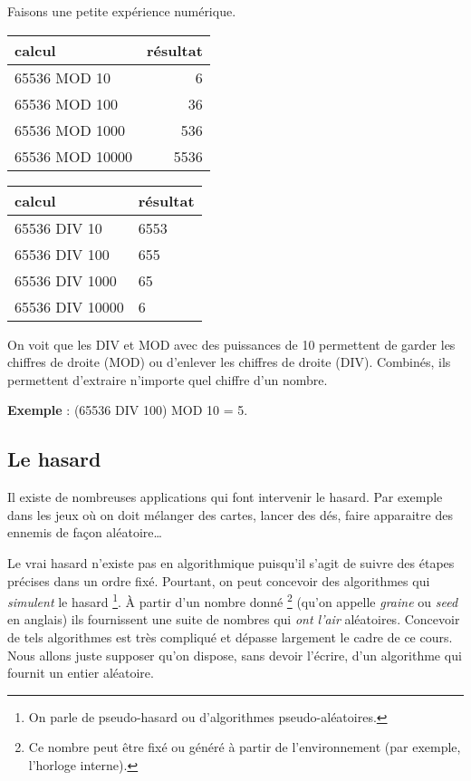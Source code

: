 				Faisons une petite expérience numérique.
				\begin{center}
				\begin{tabular}{|l|r|}\hline
					calcul & résultat \\\hline
					\hline
					65536 MOD 10 & 6 \\  
					65536 MOD 100 & 36 \\  
					65536 MOD 1000 & 536 \\  
					65536 MOD 10000 & 5536 \\ 
					\hline 
				\end{tabular}
				\qquad
				\begin{tabular}{|l|l|}\hline
					calcul & résultat \\\hline
					\hline
					65536 DIV 10 & 6553 \\  
					65536 DIV 100 & 655 \\  
					65536 DIV 1000 & 65 \\  
					65536 DIV 10000 & 6 \\ 
					\hline 
				\end{tabular}
				\end{center}
			
				On voit que les DIV et MOD avec des puissances de 10
				permettent de garder les chiffres de droite (MOD)
				ou d'enlever les chiffres de droite (DIV).
				Combinés, ils permettent d'extraire n'importe quel
				chiffre d'un nombre.
				
				\textbf{Exemple} : (65536 DIV 100) MOD 10 = 5.

		\subsection{Le hasard}
			
			Il existe de nombreuses applications 
			qui font intervenir le hasard.
			Par exemple dans les jeux où on doit mélanger des cartes,
			lancer des dés, 
			faire apparaitre des ennemis de façon aléatoire\dots
			
			Le vrai hasard n'existe pas en algorithmique
			puisqu'il s'agit de suivre des étapes précises
			dans un ordre fixé.
			Pourtant, on peut concevoir des algorithmes
			qui \emph{simulent} le hasard%
			\footnote{%
				On parle de pseudo-hasard
				ou d'algorithmes pseudo-aléatoires.
			}.
			À partir d'un nombre donné%
			\footnote{%
				Ce nombre peut être fixé ou généré à partir
				de l'environnement 
				(par exemple, l'horloge interne).
			}
			(qu'on appelle \emph{graine} ou \emph{seed} en anglais)
			ils fournissent une suite de nombres qui \emph{ont l'air}
			aléatoires.			
			Concevoir de tels algorithmes est très compliqué
			et dépasse largement le cadre de ce cours.
			Nous allons juste supposer qu'on dispose,
			sans devoir l'écrire,
			d'un algorithme qui fournit un entier aléatoire.
			
